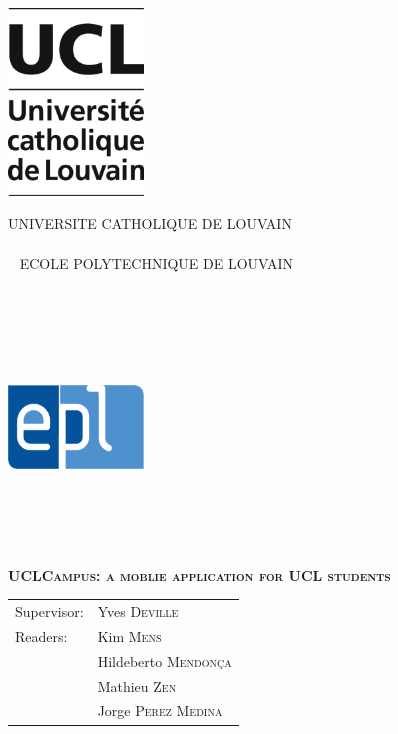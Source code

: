 \documentclass[11pt, a4paper]{report}
\renewcommand\title{UCLCampus: a moblie application for UCL students}
\newcommand\supervisor{Yves \textsc{Deville}}
\newcommand\readerone{Kim \textsc{Mens}}
\newcommand\readertwo{Hildeberto \textsc{Mendonça}}
\newcommand\readerthree{Mathieu \textsc{Zen}}
\newcommand\readerfour{Jorge \textsc{Perez Medina}}
\begin{document}
\thispagestyle{empty}
\noindent\begin{minipage}{.25\textwidth}
\noindent\includegraphics[width=3.6cm]{Images/ucl.jpg}
\end{minipage}
\begin{minipage}{.5\textwidth}
\begin{center}
UNIVERSITE CATHOLIQUE DE LOUVAIN
\\~\\~
ECOLE POLYTECHNIQUE DE LOUVAIN
\\~\\~\\~\\~\\~
\end{center}
\end{minipage}
\begin{minipage}{.25\textwidth}
\hfill\includegraphics[width=3.6cm]{Images/epl.jpg}
\\~\\~\\~\\~
\end{minipage}
\vspace{4.5cm}
\begin{center}
\bfseries{\scshape{\Huge{\title}}}
\end{center}
\vspace{4.5cm}
\begin{minipage}{.5\textwidth}
\begin{tabular}{ll}
Supervisor: & \supervisor
\\ Readers: & \readerone 
\\          & \readertwo 
\\          & \readerthree
\\          & \readerfour
\end{tabular} 
\\~\\~
\end{minipage}
\end{document}
